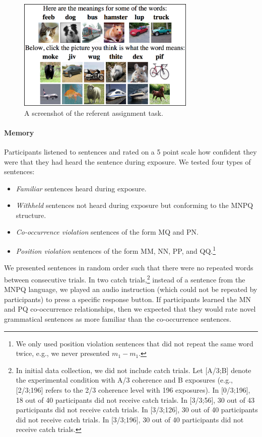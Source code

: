\documentclass[man,floatsintext]{apa6}
\begin{document}
\begin{figure}[t]
  \begin{center}
    \includegraphics[width=8.5cm]{meaning-html-cropped.png}
    \caption{A screenshot of the referent assignment task.}
    \label{meaning-task}
  \end{center}
\end{figure}

\paragraph{Memory}
Participants listened to sentences and rated on a 5 point scale how confident they were that they had heard the sentence during exposure. We tested four types of sentences:

\begin{itemize}
\item \emph{Familiar} sentences heard during exposure.
\item \emph{Withheld} sentences not heard during exposure but conforming to the MNPQ structure.
\item \emph{Co-occurrence violation} sentences of the form MQ and PN.
\item \emph{Position violation} sentences of the form MM, NN, PP, and QQ.\footnote{ We only used position violation sentences that did not repeat the same word twice, e.g., we never presented $m_1 - m_1$.}
\end{itemize}

We presented sentences in random order such that there were no repeated words between consecutive trials. In two catch trials,\footnote{\label{catch-trials} In initial data collection, we did not include catch trials.  Let [A/3;B] denote the experimental condition with A/3 coherence and B exposures (e.g., [2/3;196] refers to the 2/3 coherence level with 196 exposures). In [0/3;196], 18 out of 40 participants did not receive catch trials. In [3/3;56], 30 out of 43 participants did not receive catch trials. In [3/3;126], 30 out of 40 participants did not receive catch trials. In [3/3;196], 30 out of 40 participants did not receive catch trials.} instead of a sentence from the MNPQ language, we played an audio instruction (which could not be repeated by participants) to press a specific response button.  If participants learned the MN and PQ co-occurrence relationships, then we expected that they would rate novel grammatical sentences as more familiar than the co-occurrence sentences.
\end{document}
